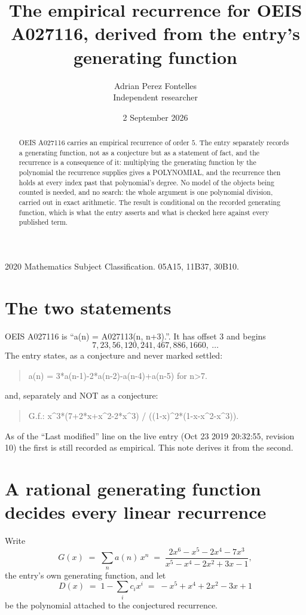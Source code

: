 \documentclass[11pt,a4paper]{article}
\title{The empirical recurrence for OEIS A027116, derived from the entry's generating function}
\author{Adrian Perez Fontelles\\ \small Independent researcher}
\date{2 September 2026}
\theoremstyle{plain}
\theoremstyle{definition}
\begin{document}
\maketitle

\begin{abstract}
OEIS A027116 carries an empirical recurrence of order $5$. The entry separately records a
generating function, not as a conjecture but as a statement of fact, and the recurrence is a
consequence of it: multiplying the generating function by the polynomial the recurrence
supplies gives a POLYNOMIAL, and the recurrence then holds at every index past that
polynomial's degree. No model of the objects being counted is needed, and no search: the
whole argument is one polynomial division, carried out in exact arithmetic. The result is
conditional on the recorded generating function, which is what the entry asserts and what is
checked here against every published term.
\end{abstract}

\noindent\small 2020 Mathematics Subject Classification. 05A15, 11B37, 30B10.\normalsize

\section{The two statements}

OEIS A027116 is ``a(n) = A027113(n, n+3).''. It has offset $3$ and begins
\[
7, 23, 56, 120, 241, 467, 886, 1660,\ \dots
\]
The entry states, as a conjecture and never marked settled:
\begin{quote}
a(n) = 3*a(n-1)-2*a(n-2)-a(n-4)+a(n-5) for n>7.
\end{quote}
and, separately and NOT as a conjecture:
\begin{quote}
G.f.: x\^{}3*(7+2*x+x\^{}2-2*x\^{}3) / ((1-x)\^{}2*(1-x-x\^{}2-x\^{}3)).
\end{quote}
As of the ``Last modified'' line on the live entry (Oct 23 2019 20:32:55, revision 10) the first is still
recorded as empirical. This note derives it from the second.

\section{A rational generating function decides every linear recurrence}

Write
\[
G(x)\;=\;\sum_{n}a(n)\,x^{n}\;=\;\frac{2 x^{6} - x^{5} - 2 x^{4} - 7 x^{3}}{x^{5} - x^{4} - 2 x^{2} + 3 x - 1},
\]
the entry's own generating function, and let
\[
D(x)\;=\;1-\sum_i c_i x^{i}\;=\;- x^{5} + x^{4} + 2 x^{2} - 3 x + 1
\]
be the polynomial attached to the conjectured recurrence.
\end{document}
